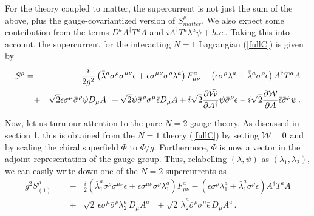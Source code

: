 For the theory coupled to matter, the supercurrent is not just the sum
of the above, plus the gauge-covariantized version of $S^\rho_{matter}$. 
We also expect some contribution from the terms $D^a A^\dagger T^a A$
and $i A^\dagger T^a \lambda^a\psi+h.c.$. Taking this into account,
the supercurrent for the interacting $N=1$ Lagrangian (\ref{fullC}) is
given by 
\begin{eqnarray}
S^\rho = &-&\frac{i}{2g^2}\left(\bar{\lambda}^a \bar{\sigma}^\rho
\sigma^{\mu\nu}\epsilon +\bar{\epsilon}\bar{\sigma}^{\mu\nu} 
\bar{\sigma}^\rho \lambda^a\right) F^a_{\mu\nu} -
\left(\bar{\epsilon} \bar{\sigma}^\rho \lambda^a + \bar{\lambda}^a 
\bar{\sigma}^\rho \epsilon\right) A^\dagger T^a A
\nonumber\\
&+& \sqrt{2}\epsilon\sigma^\mu \bar{\sigma}^\rho \psi D_\mu A^\dagger
+\sqrt{2}\bar{\psi}\bar{\sigma}^\rho\sigma^\mu\bar{\epsilon}D_\mu A
+i\sqrt{2}\frac{\partial \bar{\cal W}}{\partial A^\dagger}\bar{\psi}
\bar{\sigma}^\rho\epsilon-i\sqrt{2}\frac{\partial{\cal W}}{\partial A}
\bar{\epsilon}\bar{\sigma}^\rho \psi\,.
\label{N=1sc}
\end{eqnarray}

Now, let us turn our attention to the pure $N=2$ gauge theory. As
discussed in section 1, this is obtained from the $N=1$ theory
(\ref{fullC}) by setting ${\cal W}=0$ and by scaling the chiral superfield
$\Phi$ to $\Phi/g$. Furthermore, $\Phi$ is now a vector in the adjoint
representation of the gauge group. Thus, relabelling $(\lambda,\psi)$
as $(\lambda_1,\lambda_2)$, we can easily write down one of the $N=2$ 
supercurrents as  
\begin{eqnarray}
g^2 S^\rho_{(1)}=&-&\frac{i}{2}\left(\bar{\lambda}^a_1\bar{\sigma}^\rho
\sigma^{\mu\nu}\epsilon + \bar{\epsilon}\bar{\sigma}^{\mu\nu}
\bar{\sigma}^\rho \lambda^a_1\right) F^a_{\mu\nu} -
\left(\bar{\epsilon}\bar{\sigma}^\rho\lambda^a_{1}+\bar{\lambda}^a_{1}
\bar{\sigma}^\rho \epsilon\right) A^\dagger T^a A 
\nonumber \\
&+&\sqrt{2}\,\epsilon\sigma^\mu\bar{\sigma}^\rho\lambda^a_{2}\, D_\mu
A^{a\dagger}+\sqrt{2}\,\bar{\lambda}^a_{2}\bar{\sigma}^\rho \sigma^\mu
\bar{\epsilon}\, D_\mu A^a \,.\nonumber 
\end{eqnarray}

